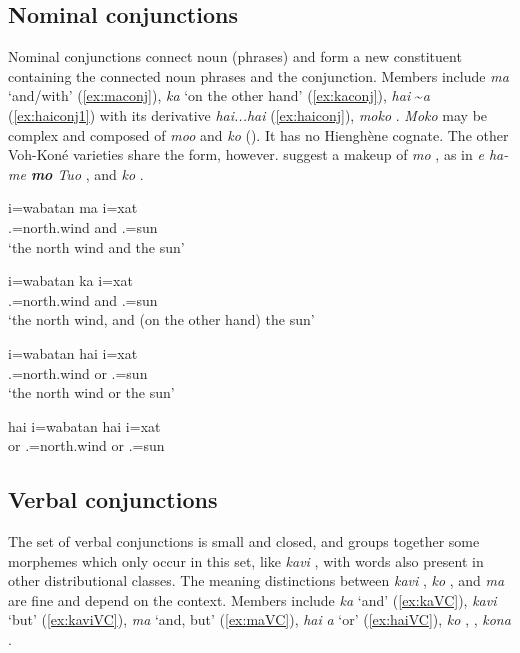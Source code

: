 \subsection{Nominal conjunctions}
\label{ssec:NomConj}

Nominal conjunctions connect noun (phrases) and form a new constituent containing the connected noun phrases and the conjunction. Members include \textit{ma} `and\slash with' (\ref{ex:maconj}), \textit{ka} `on the other hand' (\ref{ex:kaconj}), \textit{hai} \textasciitilde \textit{a}  (\ref{ex:haiconj1}) with its derivative \textit{hai...hai}  (\ref{ex:haiconj}),  \textit{moko} . \textit{Moko} may be complex and composed of \textit{moo}  and \textit{ko}  (). It has no Hienghène cognate. The other Voh-Koné varieties share the form, however. \citet[215]{rivierre_bwatoo_2006} suggest a makeup of \textit{mo} , as in \textit{e ha-me \textbf{mo} Tuo} , and \textit{ko} . 


\ea\label{ex:maconj}
\gll i=wabatan ma i=xat\\
 .=north.wind and .=sun\\
\glt `the north wind and the sun'
\z


\ea\label{ex:kaconj}
\gll i=wabatan ka i=xat\\
 .=north.wind and .=sun\\
\glt `the north wind, and (on the other hand) the sun'
\z


\ea\label{ex:haiconj1}
\gll i=wabatan hai i=xat\\
 .=north.wind or .=sun\\
\glt`the north wind or the sun'
\z


\ea\label{ex:haiconj}
\gll hai i=wabatan hai i=xat\\
 or .=north.wind or .=sun\\
\glt {}
\z

\subsection{Verbal conjunctions}
\label{ssec:VerbConj}

The set of verbal conjunctions is small and closed, and groups together some morphemes which only occur in this set, like \textit{kavi} , with words also present in other distributional classes. The meaning distinctions between \textit{kavi} , \textit{ko} \qu{but [introducing something unexpected)}, and \textit{ma}  are fine and depend on the context. Members include \textit{ka} `and' (\ref{ex:kaVC}), \textit{kavi} `but' (\ref{ex:kaviVC}), \textit{ma} `and, but' (\ref{ex:maVC}), \textit{hai} \goodtilde \textit{a} `or' (\ref{ex:haiVC}), \textit{ko} , , \textit{kona} . 


